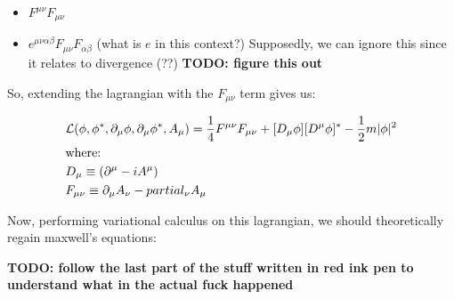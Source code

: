 \begin{itemize}
    \item $F^{\mu \nu} F_{\mu \nu}$
    \item $e^{\mu \nu \alpha \beta} F_{\mu \nu} F_{\alpha \beta}$ (what is $e$ in this context?)
        Supposedly, we can ignore this since it relates to divergence (??)
        \textbf{TODO: figure this out}
\end{itemize}

So, extending the lagrangian with the $F_{\mu \nu}$ term gives us:

\begin{align*}
    &\mathcal{L} (\phi, \phi^*, \partial_\mu \phi, \partial_\mu \phi^*, A_\mu) = 
    \frac{1}{4} F^{\mu \nu} F_{\mu \nu} + [D_\mu \phi][D^\mu \phi]^* - \frac{1}{2} m |\phi|^2 \\
    &\text{where:}\\
    &D_\mu \equiv (\partial^\mu - i A^\mu) \\
    &F_{\mu\nu} \equiv \partial_\mu A_\nu - partial_\nu A_\mu
\end{align*}

Now, performing variational calculus on this lagrangian, we should theoretically
regain maxwell's equations:

\textbf{TODO: follow the last part of the stuff written in red ink pen to
understand what in the actual fuck happened}

